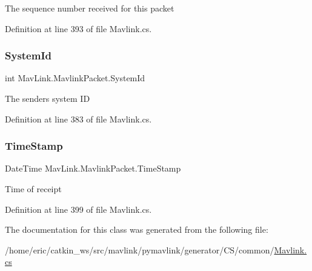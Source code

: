 The sequence number received for this packet 



Definition at line 393 of file Mavlink.\+cs.

\mbox{\label{classMavLink_1_1MavlinkPacket_ae10478e1f7182b45c452c7ce8cb14016}} 
\subsubsection{\texorpdfstring{SystemId}{SystemId}}
{\footnotesize\ttfamily int Mav\+Link.\+Mavlink\+Packet.\+System\+Id}



The sender\textquotesingle{}s system ID 



Definition at line 383 of file Mavlink.\+cs.

\mbox{\label{classMavLink_1_1MavlinkPacket_a41ba9c38f178fadebcc0efebe42a94a2}} 
\subsubsection{\texorpdfstring{TimeStamp}{TimeStamp}}
{\footnotesize\ttfamily Date\+Time Mav\+Link.\+Mavlink\+Packet.\+Time\+Stamp}



Time of receipt 



Definition at line 399 of file Mavlink.\+cs.



The documentation for this class was generated from the following file\+:\begin{DoxyCompactItemize}
\item 
/home/eric/catkin\+\_\+ws/src/mavlink/pymavlink/generator/\+C\+S/common/\mbox{\hyperlink{Mavlink_8cs}{Mavlink.\+cs}}\end{DoxyCompactItemize}
